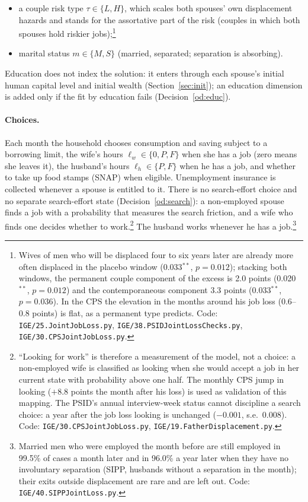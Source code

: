\documentclass[11pt]{article}
\newcommand{\code}[1]{\texttt{#1}}
\newcommand{\1}{\mathbf{1}}
\begin{document}
\begin{itemize}
{  spouses' three-digit industry, occupation and class of worker (\code{IGE/60.PaperATargets.py}). Code:
  \code{IGE/37.CPSJointLossChecks.py}, \code{IGE/25.JointJobLoss.py}, \code{IGE/40.SIPPJointLoss.py}.}
  \item a couple risk type $\tau \in \{L, H\}$, which scales both spouses' own displacement hazards and stands for the
  assortative part of the risk (couples in which both spouses hold riskier jobs);\footnote{Wives of men who will be
  displaced four to six years later are already more often displaced in the placebo window (0.033$^{**}$, $p=0.012$);
  stacking both windows, the permanent couple component of the excess is 2.0 points (0.020$^{**}$, $p=0.012$) and the
  contemporaneous component 3.3 points (0.033$^{**}$, $p=0.036$). In the CPS the elevation in the months around his job
  loss (0.6--0.8 points) is flat, as a permanent type predicts. Code: \code{IGE/25.JointJobLoss.py},
  \code{IGE/38.PSIDJointLossChecks.py}, \code{IGE/30.CPSJointJobLoss.py}.}
  \item marital status $m \in \{M, S\}$ (married, separated; separation is absorbing).
\end{itemize}
Education does not index the solution: it enters through each spouse's initial human capital level and initial wealth
(Section~\ref{sec:init}); an education dimension is added only if the fit by education fails (Decision~\ref{od:educ}).

\paragraph{Choices.} Each month the household chooses consumption and saving subject to a borrowing limit, the wife's
hours $\ell_w \in \{0, P, F\}$ when she has a job (zero means she leaves it), the husband's hours $\ell_h \in \{P, F\}$
when he has a job, and whether to take up food stamps (SNAP) when eligible. Unemployment insurance is collected
whenever a spouse is entitled to it. There is no search-effort choice and no separate search-effort state
(Decision~\ref{od:search}): a non-employed spouse finds a job with a probability that measures the search friction, and
a wife who finds one decides whether to work.\footnote{``Looking for
work'' is therefore a measurement of the model, not a choice: a non-employed wife is classified as looking when she
would accept a job in her current state with probability above one half. The monthly CPS jump in looking ($+8.8$
points the month after his loss) is used as validation of this mapping. The PSID's annual interview-week status cannot
discipline a search choice: a year after the job loss looking is unchanged ($-0.001$, s.e.\ 0.008). Code:
\code{IGE/30.CPSJointJobLoss.py}, \code{IGE/19.FatherDisplacement.py}.}
The husband works whenever he has a job.\footnote{Married men who were employed the month before are still employed in
99.5\% of cases a month later and in 96.0\% a year later when they have no involuntary separation (SIPP, husbands
without a separation in the month); their exits outside displacement are rare and are left out. Code:
\code{IGE/40.SIPPJointLoss.py}.}
\end{document}

